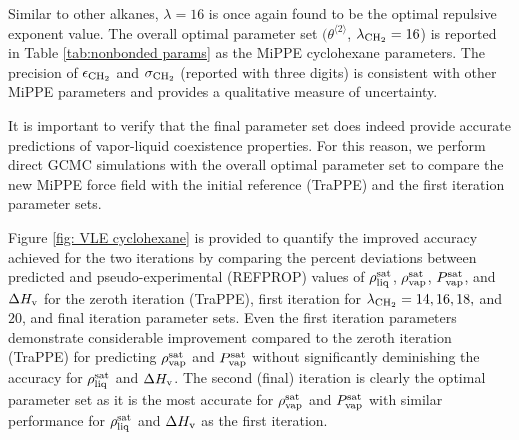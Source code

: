 \documentclass[journal=jced,manuscript=article]{achemso}
\begin{document}
Similar to other alkanes, $\lambda = 16$ is once again found to be the optimal repulsive exponent value. The overall optimal parameter set $(\theta^{\langle2\rangle}$, $\lambda_{\rm CH_2} = 16$) is reported in Table \ref{tab:nonbonded params} as the MiPPE cyclohexane parameters. The precision of $\epsilon_{\rm CH_2}$ and $\sigma_{\rm CH_2}$ (reported with three digits) is consistent with other MiPPE parameters and provides a qualitative measure of uncertainty.  

It is important to verify that the final parameter set does indeed provide accurate predictions of vapor-liquid coexistence properties. For this reason, we perform direct GCMC simulations with the overall optimal parameter set to compare the new MiPPE force field with the initial reference (TraPPE) and the first iteration parameter sets.

Figure \ref{fig: VLE cyclohexane} is provided to quantify the improved accuracy achieved for the two iterations by comparing the percent deviations between predicted and pseudo-experimental (REFPROP) values of $\rho_{\rm liq}^{\rm sat}$, $\rho_{\rm vap}^{\rm sat}$, $P_{\rm vap}^{\rm sat}$, and $\Delta H_{\rm v}$ for the zeroth iteration (TraPPE), first iteration for $\lambda_{\rm CH_2} = 14, 16, 18,$ and $20$, and final iteration parameter sets. Even the first iteration parameters demonstrate considerable improvement compared to the zeroth iteration (TraPPE) for predicting $\rho_{\rm vap}^{\rm sat}$ and $P_{\rm vap}^{\rm sat}$ without significantly deminishing the accuracy for $\rho_{\rm liq}^{\rm sat}$ and $\Delta H_{\rm v}$. The second (final) iteration is clearly the optimal parameter set as it is the most accurate for $\rho_{\rm vap}^{\rm sat}$ and $P_{\rm vap}^{\rm sat}$ with similar performance for $\rho_{\rm liq}^{\rm sat}$ and $\Delta H_{\rm v}$ as the first iteration.
\end{document}
